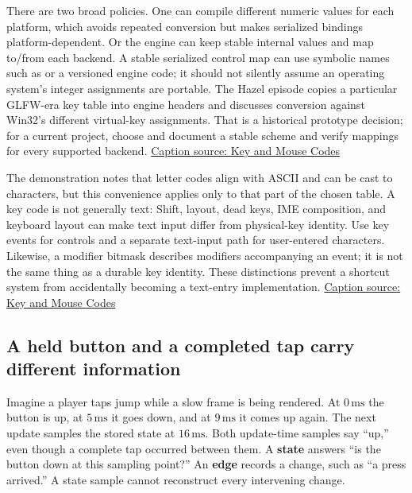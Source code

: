 There are two broad policies. One can compile different numeric values for each platform, which avoids repeated conversion but makes serialized bindings platform-dependent. Or the engine can keep stable internal values and map to/from each backend. A stable serialized control map can use symbolic names such as  or a versioned engine code; it should not silently assume an operating system's integer assignments are portable. The Hazel episode copies a particular GLFW-era key table into engine headers and discusses conversion against Win32's different virtual-key assignments. That is a historical prototype decision; for a current project, choose and document a stable scheme and verify mappings for every supported backend. \href{https://www.youtube.com/watch?v=zaJGn8pur5I}{Caption source: Key and Mouse Codes}

The demonstration notes that letter codes align with ASCII and can be cast to characters, but this convenience applies only to that part of the chosen table. A key code is not generally text: Shift, layout, dead keys, IME composition, and keyboard layout can make text input differ from physical-key identity. Use key events for controls and a separate text-input path for user-entered characters. Likewise, a modifier bitmask describes modifiers accompanying an event; it is not the same thing as a durable key identity. These distinctions prevent a shortcut system from accidentally becoming a text-entry implementation. \href{https://www.youtube.com/watch?v=zaJGn8pur5I}{Caption source: Key and Mouse Codes}

\subsection{A held button and a completed tap carry different information}\label{05-engine-i-ch014-a-held-button-and-a-completed-tap-carry-different-information}

\hypertarget{05-engine-i-ch014-a-held-button-and-a-completed-tap-carry-different-information}{}

Imagine a player taps jump while a slow frame is being rendered. At \(0\,\mathrm{ms}\) the button is up, at \(5\,\mathrm{ms}\) it goes down, and at \(9\,\mathrm{ms}\) it comes up again. The next update samples the stored state at \(16\,\mathrm{ms}\). Both update-time samples say ``up,'' even though a complete tap occurred between them. A \textbf{state} answers ``is the button down at this sampling point?'' An \textbf{edge} records a change, such as ``a press arrived.'' A state sample cannot reconstruct every intervening change.

